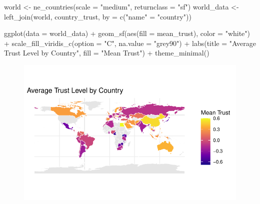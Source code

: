 \documentclass[
  letterpaper,
  DIV=11,
  numbers=noendperiod]{scrartcl}
\newenvironment{Shaded}{\begin{snugshade}}{\end{snugshade}}
\newcommand{\AttributeTok}[1]{\textcolor[rgb]{0.40,0.45,0.13}{#1}}
\newcommand{\FunctionTok}[1]{\textcolor[rgb]{0.28,0.35,0.67}{#1}}
\newcommand{\NormalTok}[1]{\textcolor[rgb]{0.00,0.23,0.31}{#1}}
\newcommand{\OtherTok}[1]{\textcolor[rgb]{0.00,0.23,0.31}{#1}}
\newcommand{\SpecialCharTok}[1]{\textcolor[rgb]{0.37,0.37,0.37}{#1}}
\newcommand{\StringTok}[1]{\textcolor[rgb]{0.13,0.47,0.30}{#1}}
\begin{document}
\begin{Shaded}
\begin{Highlighting}[]
\NormalTok{world }\OtherTok{\textless{}{-}} \FunctionTok{ne\_countries}\NormalTok{(}\AttributeTok{scale =} \StringTok{"medium"}\NormalTok{, }\AttributeTok{returnclass =} \StringTok{"sf"}\NormalTok{)}
\NormalTok{world\_data }\OtherTok{\textless{}{-}} \FunctionTok{left\_join}\NormalTok{(world, country\_trust, }\AttributeTok{by =} \FunctionTok{c}\NormalTok{(}\StringTok{"name"} \OtherTok{=} \StringTok{"country"}\NormalTok{))}


\FunctionTok{ggplot}\NormalTok{(}\AttributeTok{data =}\NormalTok{ world\_data) }\SpecialCharTok{+}
  \FunctionTok{geom\_sf}\NormalTok{(}\FunctionTok{aes}\NormalTok{(}\AttributeTok{fill =}\NormalTok{ mean\_trust), }\AttributeTok{color =} \StringTok{"white"}\NormalTok{) }\SpecialCharTok{+}
  \FunctionTok{scale\_fill\_viridis\_c}\NormalTok{(}\AttributeTok{option =} \StringTok{"C"}\NormalTok{, }\AttributeTok{na.value =} \StringTok{"grey90"}\NormalTok{) }\SpecialCharTok{+}
  \FunctionTok{labs}\NormalTok{(}\AttributeTok{title =} \StringTok{"Average Trust Level by Country"}\NormalTok{,}
       \AttributeTok{fill =} \StringTok{"Mean Trust"}\NormalTok{) }\SpecialCharTok{+}
  \FunctionTok{theme\_minimal}\NormalTok{()}
\end{Highlighting}
\end{Shaded}

\begin{figure}[H]

{\centering \includegraphics{Milestone-2-Data_files/figure-pdf/unnamed-chunk-6-1.pdf}

}

\end{figure}
\end{document}

